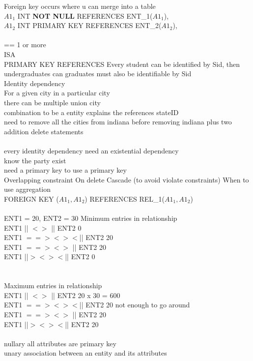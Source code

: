 \documentclass[11pt]{article}
\begin{document}
 Foreign key occurs where u can merge into a table\\
$A1_1$ INT \textbf{NOT NULL} REFERENCES ENT_1($A1_1$),\\
$A1_2$ INT PRIMARY KEY REFERENCES ENT_2($A1_2$),\\
\\
== 1 or more 
\\
ISA \\
PRIMARY KEY REFERENCES
Every student can be identified by Sid, then undergraduates can graduates must also be identifiable by Sid
\\
Identity dependency\\
For a given city in a particular city\\
there can be multiple union city\\
combination to be a entity
explains the references stateID\\
need to remove all the cities from indiana before removing indiana
plus two addition delete statements\\
\\
every identity dependency need an existential dependency\\
know the party exist\\
need a primary key to use a primary key\\
Overlapping constraint 
On delete Cascade (to avoid violate constraints)
When to use aggregation\\
FOREIGN KEY ($A1_1, A1_2$) REFERENCES REL_1($A1_1, A1_2$)\\
\\
ENT1 = 20, ENT2 = 30
Minimum entries in relationship\\
ENT1 || $<>$ || 	ENT2  0\\
ENT1 $==> <> <$|| ENT2 20\\
ENT1 $==> <> $ || ENT2 20 \\
ENT1 ||$> <> <$|| ENT2 0 \\
\\\\
Maximum entries in relationship\\
ENT1 || $<>$ || 	 ENT2 20 x 30 = 600\\
ENT1 $==> <> <$|| ENT2 20 not enough to go around\\
ENT1 $==> <> $ ||  ENT2 20\\
ENT1 ||$> <> <$||  ENT2 20\\
\\
nullary all attributes are primary key\\
unary  association between an entity and its attributes\\ 
\end{document}
